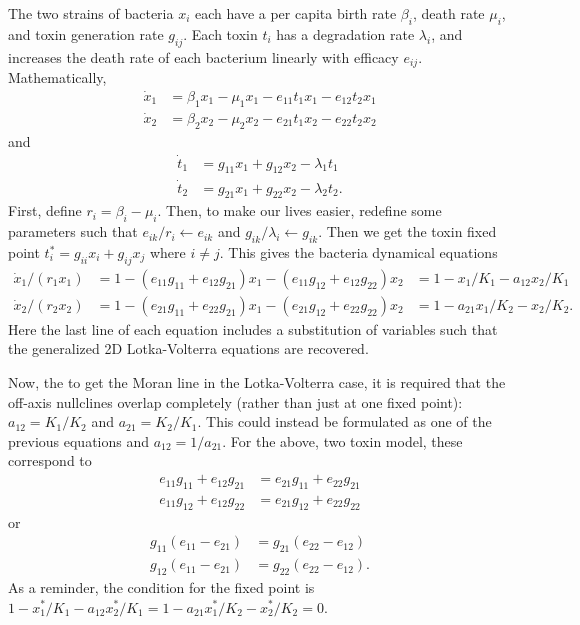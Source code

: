\documentclass[a4paper,11pt]{article}
\numberwithin{equation}{section} %
\begin{document}
The two strains of bacteria $x_i$ each have a per capita birth rate $\beta_i$, death rate $\mu_i$, and toxin generation rate $g_{ij}$. 
Each toxin $t_i$ has a degradation rate $\lambda_i$, and increases the death rate of each bacterium linearly with efficacy $e_{ij}$. 
Mathematically, 
\begin{align*}
\dot{x}_1 &= \beta_1 x_1 - \mu_1 x_1 - e_{11} t_1 x_1 - e_{12} t_2 x_1 \\
\dot{x}_2 &= \beta_2 x_2 - \mu_2 x_2 - e_{21} t_1 x_2 - e_{22} t_2 x_2
\end{align*}
and
\begin{align*}
\dot{t}_1 &= g_{11}x_1+g_{12}x_2 - \lambda_1 t_1 \\
\dot{t}_2 &= g_{21}x_1+g_{22}x_2 - \lambda_2 t_2.
\end{align*}
First, define $r_i = \beta_i-\mu_i$. 
Then, to make our lives easier, redefine some parameters such that $e_{ik}/r_i \leftarrow e_{ik}$ and $g_{ik}/\lambda_i \leftarrow g_{ik}$. 
Then we get the toxin fixed point $t^*_i=g_{ii}x_i+g_{ij}x_j$ where $i\neq j$. This gives the bacteria dynamical equations
\begin{align*}
\dot{x}_1/(r_1 x_1) &= 1 - (e_{11}g_{11}+e_{12}g_{21}) x_1 - (e_{11}g_{12}+e_{12}g_{22}) x_2 &= 1 - x_1/K_1 - a_{12}x_2/K_1 \\
\dot{x}_2/(r_2 x_2) &= 1 - (e_{21}g_{11}+e_{22}g_{21}) x_1 - (e_{21}g_{12}+e_{22}g_{22}) x_2 &= 1 - a_{21}x_1/K_2 - x_2/K_2. 
\end{align*}
Here the last line of each equation includes a substitution of variables such that the generalized 2D Lotka-Volterra equations are recovered. 

Now, the to get the Moran line in the Lotka-Volterra case, it is required that the off-axis nullclines overlap completely (rather than just at one fixed point): $a_{12}=K_1/K_2$ and $a_{21}=K_2/K_1$. 
This could instead be formulated as one of the previous equations and $a_{12}=1/a_{21}$. 
For the above, two toxin model, these correspond to
\begin{align}
e_{11}g_{11}+e_{12}g_{21}&=e_{21}g_{11}+e_{22}g_{21} \\
e_{11}g_{12}+e_{12}g_{22}&=e_{21}g_{12}+e_{22}g_{22}
\end{align}
or
\begin{align*}
g_{11}(e_{11}-e_{21})&=g_{21}(e_{22}-e_{12}) \\
g_{12}(e_{11}-e_{21})&=g_{22}(e_{22}-e_{12}). 
\end{align*}
As a reminder, the condition for the fixed point is $1 - x^*_1/K_1 - a_{12}x^*_2/K_1=1 - a_{21}x^*_1/K_2 - x^*_2/K_2=0$. 
\end{document}

